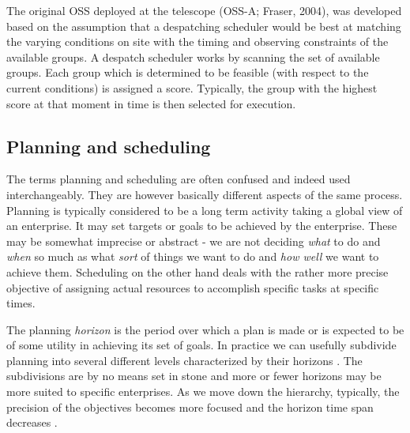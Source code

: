 The original OSS deployed at the telescope (OSS-A; Fraser, 2004), was developed based on the assumption that a despatching scheduler would be best at matching the varying conditions on site with the timing and observing constraints of the available groups. A despatch scheduler works by scanning the set of available groups. Each group which is determined to be feasible (with respect to the current conditions) is assigned a score. Typically, the group with the highest score at that moment in time is then selected for execution.




\subsection{Planning and scheduling}
\label{sect:pandstimescales}
The terms planning and scheduling are often confused and indeed used interchangeably. They are however basically different aspects of the same process.
Planning is typically considered to be a long term activity taking a global view of an enterprise. It may set targets or goals to be achieved by the enterprise. These may be somewhat imprecise or abstract - we are not deciding \emph{what} to do and \emph{when} so much as what \emph{sort} of things we want to do and \emph{how well} we want to achieve them. Scheduling on the other hand deals with the rather more precise objective of assigning actual resources to accomplish specific tasks at specific times.

The planning \emph{horizon} is the period over which a plan is made or is expected to be of some utility in achieving its set of goals. In practice we can usefully subdivide planning into several different levels characterized by their horizons \citep{haxhierarchic73}. The subdivisions are by no means set in stone and more or fewer horizons may be more suited to specific enterprises. As we move down the hierarchy, typically, the precision of the objectives becomes more focused and the horizon time span decreases \citep{chien00aspen}.

